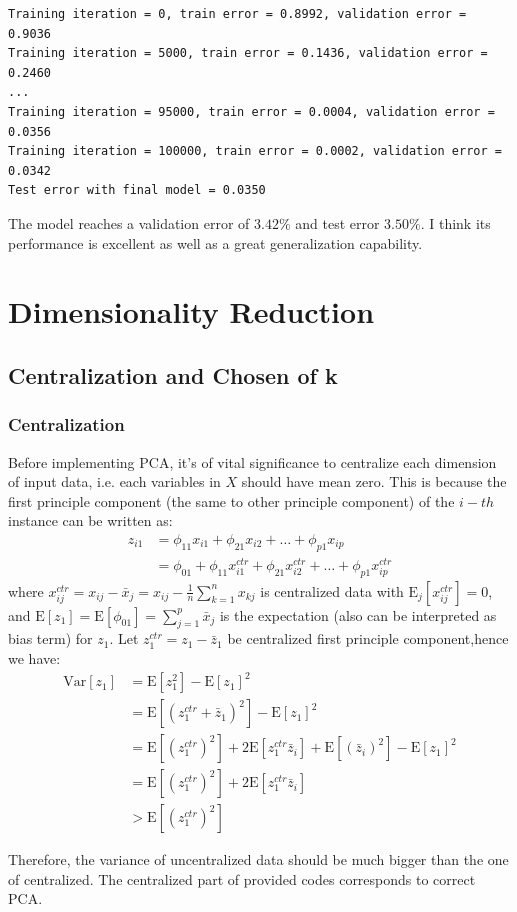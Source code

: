 \documentclass{article}
\begin{document}
\begin{commandline}
	\begin{verbatim}
Training iteration = 0, train error = 0.8992, validation error = 0.9036
Training iteration = 5000, train error = 0.1436, validation error = 0.2460
...
Training iteration = 95000, train error = 0.0004, validation error = 0.0356
Training iteration = 100000, train error = 0.0002, validation error = 0.0342
Test error with final model = 0.0350
	\end{verbatim}
\end{commandline}

The model reaches a validation error of $3.42\%$ and test error $3.50\%$. I think its performance is excellent as well as a great generalization capability.

\pagebreak

\section{Dimensionality Reduction}

\subsection{Centralization and Chosen of k}
\subsubsection{Centralization}
Before implementing PCA, it's of vital significance to centralize each dimension of input data, i.e. each variables in $X$ should have mean zero. This is because the first principle component (the same to other principle component) of the $i-th$ instance can be written as:
\[
\begin{aligned}
z_{i1}&=\phi_{11}x_{i1}+\phi_{21}x_{i2}+\dots+\phi_{p1}x_{ip}\\
&=\phi_{01}+\phi_{11}x_{i1}^{ctr}+\phi_{21}x_{i2}^{ctr}+\dots+\phi_{p1}x_{ip}^{ctr}
\end{aligned}
\]
where $x_{ij}^{ctr}=x_{ij}-\bar{x}_j=x_{ij}-\frac{1}{n}\sum_{k=1}^nx_{kj}$ is centralized data with $\mathrm{E}_j[x_{ij}^{ctr}]=0$, and $\mathrm{E}[z_1]=\mathrm{E}[\phi_{01}]=\sum_{j=1}^p\bar{x}_j$ is the expectation (also can be interpreted as bias term) for $z_{1}$.
Let $z_1^{ctr}=z_1-\bar{z}_1$ be centralized first principle component,hence we have:
\[
\begin{aligned}
\mathrm{Var}[z_1]&=\mathrm{E}[z_1^2]-\mathrm{E}[z_1]^2\\
&=\mathrm{E}[(z_1^{ctr}+\bar{z}_1)^2]-\mathrm{E}[z_1]^2\\
&=\mathrm{E}[(z_1^{ctr})^2]+2\mathrm{E}[z_1^{ctr}\bar{z}_i]+\mathrm{E}[(\bar{z}_i)^2]-\mathrm{E}[z_1]^2\\
&=\mathrm{E}[(z_1^{ctr})^2]+2\mathrm{E}[z_1^{ctr}\bar{z}_i]\\
&>\mathrm{E}[(z_1^{ctr})^2]
\end{aligned}
\]\par
Therefore, the variance of uncentralized data should be much bigger than the one of centralized. The centralized part of provided codes corresponds to correct PCA.\par
\end{document}
